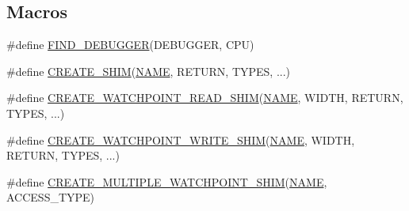 \subsection*{Macros}
\begin{DoxyCompactItemize}
\item 
\#define \mbox{\hyperlink{arm_2debugger_2memory-debugger_8c_ac0a015bae6add1406e70a94743727d6d}{F\+I\+N\+D\+\_\+\+D\+E\+B\+U\+G\+G\+ER}}(D\+E\+B\+U\+G\+G\+ER,  C\+PU)
\item 
\#define \mbox{\hyperlink{arm_2debugger_2memory-debugger_8c_a4d5ad277707fe5cfe2cbe6292720d924}{C\+R\+E\+A\+T\+E\+\_\+\+S\+H\+IM}}(\mbox{\hyperlink{inflate_8h_a164ea0159d5f0b5f12a646f25f99eceaa67bc2ced260a8e43805d2480a785d312}{N\+A\+ME}},  R\+E\+T\+U\+RN,  T\+Y\+P\+ES, ...)
\item 
\#define \mbox{\hyperlink{arm_2debugger_2memory-debugger_8c_ad09cc838e97e4312502897565e1ba045}{C\+R\+E\+A\+T\+E\+\_\+\+W\+A\+T\+C\+H\+P\+O\+I\+N\+T\+\_\+\+R\+E\+A\+D\+\_\+\+S\+H\+IM}}(\mbox{\hyperlink{inflate_8h_a164ea0159d5f0b5f12a646f25f99eceaa67bc2ced260a8e43805d2480a785d312}{N\+A\+ME}},  W\+I\+D\+TH,  R\+E\+T\+U\+RN,  T\+Y\+P\+ES, ...)
\item 
\#define \mbox{\hyperlink{arm_2debugger_2memory-debugger_8c_af7ff0881f887c0f2ce839fa3e91646d6}{C\+R\+E\+A\+T\+E\+\_\+\+W\+A\+T\+C\+H\+P\+O\+I\+N\+T\+\_\+\+W\+R\+I\+T\+E\+\_\+\+S\+H\+IM}}(\mbox{\hyperlink{inflate_8h_a164ea0159d5f0b5f12a646f25f99eceaa67bc2ced260a8e43805d2480a785d312}{N\+A\+ME}},  W\+I\+D\+TH,  R\+E\+T\+U\+RN,  T\+Y\+P\+ES, ...)
\item 
\#define \mbox{\hyperlink{arm_2debugger_2memory-debugger_8c_a008fc423e33f25eeda54fcfcbd2036c4}{C\+R\+E\+A\+T\+E\+\_\+\+M\+U\+L\+T\+I\+P\+L\+E\+\_\+\+W\+A\+T\+C\+H\+P\+O\+I\+N\+T\+\_\+\+S\+H\+IM}}(\mbox{\hyperlink{inflate_8h_a164ea0159d5f0b5f12a646f25f99eceaa67bc2ced260a8e43805d2480a785d312}{N\+A\+ME}},  A\+C\+C\+E\+S\+S\+\_\+\+T\+Y\+PE)
\end{DoxyCompactItemize}
